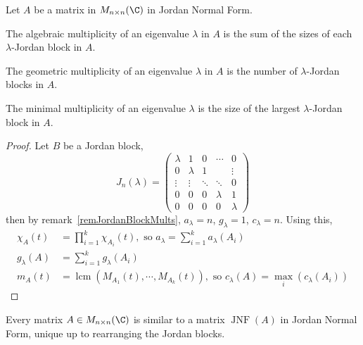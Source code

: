 \documentclass[../Main.tex]{subfiles}
\begin{document}
\begin{propositions}{
        Let $A$ be a matrix in $M_{n \times n}(\C)$ in Jordan Normal Form.
        \label{propsJNFMults}
    }
    \item The algebraic multiplicity of an eigenvalue $\lambda$ in $A$ is the sum of the sizes of each $\lambda$-Jordan block in $A$. \label{propJNFAMult}
    \item The geometric multiplicity of an eigenvalue $\lambda$ in $A$ is the number of $\lambda$-Jordan blocks in $A$. \label{propJNFGMult}
    \item The minimal multiplicity of an eigenvalue $\lambda$ is the size of the largest $\lambda$-Jordan block in $A$. \label{propGNFCMult}
\end{propositions}
\begin{proof}
    Let $B$ be a Jordan block,
    \begin{equation*}
        J_n(\lambda) =
        \begin{pmatrix}
            \lambda & 1 & 0 & \cdots & 0 \\
            0 & \lambda & 1 & & \vdots \\
            \vdots & \vdots & \ddots & \ddots & 0 \\
            0 & 0 & 0 & \lambda & 1 \\
            0 & 0 & 0 & 0 & \lambda
        \end{pmatrix}
    \end{equation*}
    then by remark~\ref{remJordanBlockMults}, $a_\lambda = n$, $g_{\lambda} = 1$, $c_\lambda = n$. Using this,
    \begin{align*}
        \chi_A(t) &= \prod_{i=1}^{k} \chi_{A_i}(t), \text{ so }a_{\lambda} = \sum_{i=1}^{k}a_\lambda(A_i) \\
        g_\lambda(A) &= \sum_{i=1}^{k} g_{\lambda}(A_i) \\
        m_A(t) &= \operatorname{lcm}(M_{A_1}(t), \cdots, M_{A_k}(t)), \text{ so }c_\lambda(A) = \max_{i} (c_\lambda(A_i))
    \end{align*}
\end{proof}
\begin{theorem}
    Every matrix $A \in M_{n \times n}(\C)$ is similar to a matrix $\operatorname{JNF}(A)$ in Jordan Normal Form, unique up to rearranging the Jordan blocks.
    \label{thmJNF}
\end{theorem}
\end{document}
